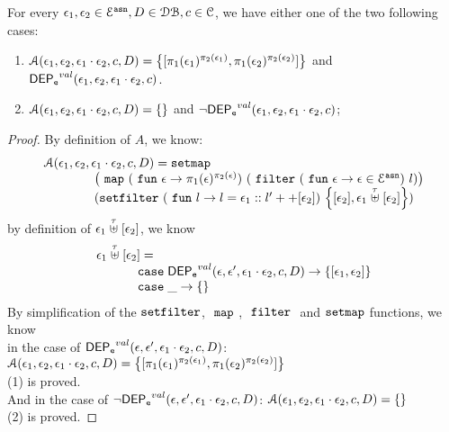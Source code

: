 %
\begin{lem}
\label{lem:inv_alg2}
For every $\mathtt{\epsilon}_1, \mathtt{\epsilon}_2 \in \mathcal{E}^{\mathtt{{asn}}}, D \in \mathcal{DB} , c \in \mathcal{C}$, we have either one of the two following cases:
\begin{enumerate}
  \item $\mathcal{A}(\event_1, \event_2, \event_1 \cdot \event_2, c, D) = 
  \left\{[\pi_1(\event_1)^{\pi_2(\event_1)}, \pi_1(\event_2)^{\pi_2(\event_2)}] \right \}$ 
  and $\mathsf{DEP_{\mathtt{e}}}^{val}(\mathtt{\epsilon}_1, \mathtt{\epsilon}_2, \mathtt{\epsilon}_1 \cdot \mathtt{\epsilon}_2, c)$.
  \item  $\mathcal{A}(\mathtt{\epsilon}_1, \mathtt{\epsilon}_2, \mathtt{\epsilon}_1 \cdot \mathtt{\epsilon}_2, c, D) = \{\}$ 
  and $\neg \mathsf{DEP_{\mathtt{e}}}^{val}(\mathtt{\epsilon}_1, \mathtt{\epsilon}_2, \mathtt{\epsilon}_1 \cdot \mathtt{\epsilon}_2, c)$;
\end{enumerate}
\end{lem}
\begin{proof}
By definition of $A$, we know:
%
\[
	\begin{array}{l}
	\mathcal{A}(\event_1, \event_2, \event_1 \cdot \event_2, c, D)
	= 
	\kw{setmap} ~
	\\ \qquad \qquad
	\left(\emap 
		(\efun  \event \to \pi_1(\event)^{\pi_2(\event)})	
	~
	(\efilter 
		(\efun \event \to  \event \in \eventset^{\asn}) ~ l) \right)
	\\ \qquad \qquad
	(\kw{setfilter} ~
		(\efun l \to l = \event_1 :: l' ++ [\event_2]) ~ 
		\left\{[\event_2], \event_1 \stackrel{\trace}{\uplus} [\event_2] \right\})
	\end{array}
\]
by definition of $ \mathtt{\epsilon}_1 \stackrel{\mathtt{\tau}}{\uplus} [\mathtt{\epsilon}_2] $, we know 
\[
	\begin{array}{l}
	\event_1 \stackrel{\trace}{\uplus} [\event_2]
	=   
	\\ \quad \qquad 	
	\ecase \eventdep^{val}(\event, \event', \event_1 \cdot \event_2, c, D)
	\to \left\{ [\event_1, \event_2] \right\}
	\\ \quad \qquad 	
	\ecase \_
	\to \left\{ \right\}
\end{array}
\]
%
By simplification of the $\mathtt{setfilter}$, $~\mathtt{map}~$, $~\mathtt{filter}~$ and $\mathtt{setmap}$ functions, we know
\\
in the case of $\mathsf{DEP_{\mathtt{e}}}^{val}(\mathtt{\epsilon}, \mathtt{\epsilon}', \mathtt{\epsilon}_1 \cdot \mathtt{\epsilon}_2, c, D)$:
$\mathcal{A}(\event_1, \event_2, \event_1 \cdot \event_2, c, D) = 
  \left\{[\pi_1(\event_1)^{\pi_2(\event_1)}, \pi_1(\event_2)^{\pi_2(\event_2)}] \right \}$
\\
(1) is proved.
\\
And in the case of $\neg \mathsf{DEP_{\mathtt{e}}}^{val}(\mathtt{\epsilon}, \mathtt{\epsilon}', \mathtt{\epsilon}_1 \cdot \mathtt{\epsilon}_2, c, D)$: 
$\mathcal{A}(\event_1, \event_2, \event_1 \cdot \event_2, c, D) = 
  \left\{ \right \}$
\\
(2) is proved.
\end{proof}
%
%
%
